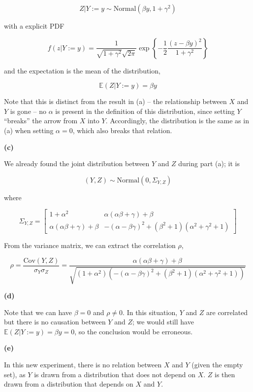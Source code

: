 \[ Z | Y := y \sim \text{Normal}\left( \beta y, 1 + \gamma^2\right) \]

with a explicit PDF

\[ f(z | Y := y) = \frac{1}{\sqrt{1 + \gamma^2} \sqrt{2 \pi}} \exp \left\{ -\frac{1}{2} \frac{\left( z - \beta y \right)^2}{1 + \gamma^2} \right\}\]

and the expectation is the mean of the distribution,

\[ \mathbb{E}(Z | Y := y) = \beta y \]

Note that this is distinct from the result in (a) -- the relationship
between \(X\) and \(Y\) is gone -- no \(\alpha\) is present in the
definition of this distribution, since setting \(Y\) ``breaks'' the
arrow from \(X\) into \(Y\). Accordingly, the distribution is the same
as in (a) when setting \(\alpha = 0\), which also breaks that relation.

\textbf{(c)}

We already found the joint distribution between \(Y\) and \(Z\) during
part (a); it is

\[ (Y, Z) \sim \text{Normal}(0, \Sigma_{Y, Z}) \]

where

\[ \Sigma_{Y, Z} = \begin{bmatrix}
1 + \alpha^2 & \alpha(\alpha \beta + \gamma) + \beta \\
\alpha(\alpha \beta + \gamma) + \beta & -(\alpha - \beta\gamma)^2 + (\beta^2 + 1)(\alpha^2 + \gamma^2 + 1)
\end{bmatrix} \]

From the variance matrix, we can extract the correlation \(\rho\),

\[ \rho = \frac{\text{Cov}(Y, Z)}{\sigma_Y \sigma_Z} = \frac{\alpha(\alpha \beta + \gamma) + \beta}{\sqrt{(1 + \alpha^2)(-(\alpha - \beta\gamma)^2 + (\beta^2 + 1)(\alpha^2 + \gamma^2 + 1))}}\]

\textbf{(d)}

Note that we can have \(\beta = 0\) and \(\rho \neq 0\). In this
situation, \(Y\) and \(Z\) are correlated but there is no causation
between \(Y\) and \(Z\); we would still have
\(\mathbb{E}(Z | Y := y) = \beta y = 0\), so the conclusion would be
erroneous.

\textbf{(e)}

In this new experiment, there is no relation between \(X\) and \(Y\)
(given the empty set), as \(Y\) is drawn from a distribution that does
not depend on \(X\). \(Z\) is then drawn from a distribution that
depends on \(X\) and \(Y\).

